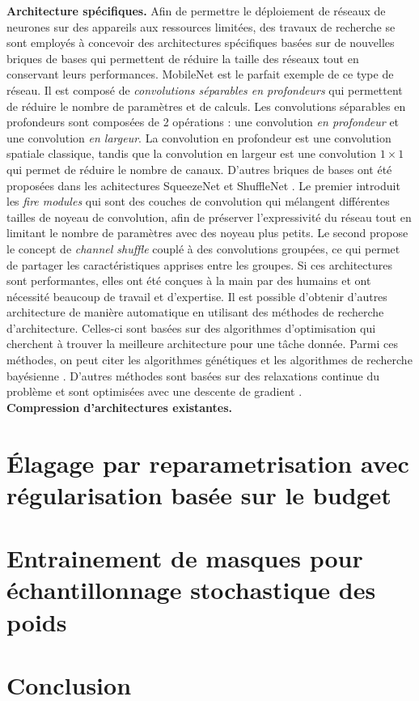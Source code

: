 \noindent \textbf{Architecture spécifiques.} Afin de permettre le déploiement de
réseaux de neurones sur des appareils aux ressources limitées, des travaux de
recherche se sont employés à concevoir des architectures spécifiques basées sur
de nouvelles briques de bases qui permettent de réduire la taille des réseaux
tout en conservant leurs performances. MobileNet
\cite{DBLP:journals/corr/HowardZCKWWAA17} est le parfait exemple de ce type de
réseau. Il est composé de \emph{convolutions séparables en profondeurs} qui
permettent de réduire le nombre de paramètres et de calculs. Les convolutions
séparables en profondeurs sont composées de 2 opérations : une convolution
\emph{en profondeur} et une convolution \emph{en largeur}. La convolution en
profondeur est une convolution spatiale classique, tandis que la convolution en
largeur est une convolution $1 \times 1$ qui permet de réduire le nombre de
canaux. D'autres briques de bases ont été proposées dans les achitectures
SqueezeNet \cite{DBLP:journals/corr/IandolaMAHDK16} et ShuffleNet
\cite{ZhangShuffleNet,MaShuffleNetV2}. Le premier introduit les \emph{fire
modules} qui sont des couches de convolution qui mélangent différentes tailles
de noyeau de convolution, afin de préserver l'expressivité du réseau tout en
limitant le nombre de paramètres avec des noyeau plus petits. Le second propose
le concept de \emph{channel shuffle} couplé à des convolutions groupées, ce qui
permet de partager les caractéristiques apprises entre les groupes. Si ces
architectures sont performantes, elles ont été conçues à la main par des humains
et ont nécessité beaucoup de travail et d'expertise. Il est possible d'obtenir
d'autres architecture de manière automatique en utilisant des méthodes de
recherche d'architecture. Celles-ci sont basées sur des algorithmes
d'optimisation qui cherchent à trouver la meilleure architecture pour une tâche
donnée. Parmi ces méthodes, on peut citer les algorithmes génétiques
\cite{DBLP:conf/icml/RealMSSSTLK17} et les algorithmes de recherche bayésienne
\cite{DBLP:conf/nips/BergstraBBK11}. D'autres méthodes sont basées sur des
relaxations continue du problème et sont optimisées avec une descente de
gradient \cite{DBLP:conf/iclr/LiuSY19}.\\

\noindent \textbf{Compression d'architectures existantes.} \lipsum[2] \\



\section*{Élagage par reparametrisation avec régularisation basée sur le budget}

\section*{Entrainement de masques pour échantillonnage stochastique des poids}

\section*{Conclusion}